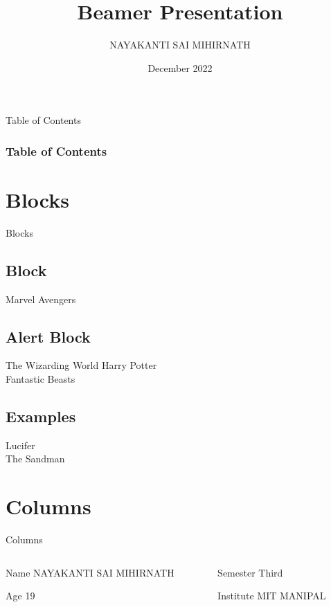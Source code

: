 \documentclass{beamer}
\title{Beamer Presentation}
\author{NAYAKANTI SAI MIHIRNATH}
\institute{MIT MANIPAL}
\date{December 2022}
\begin{document}
	\frame{\titlepage}
	\newpage
	\begin{frame}{Table of Contents}
		\frametitle{Table of Contents}
		\tableofcontents
	\end{frame}
	\newpage
	\section{Blocks}
	\begin{frame}{Blocks}
		\subsection{Block}
		\begin{block}{Marvel}
			Avengers
		\end{block}
		\subsection{Alert Block}
		\begin{alertblock}{The Wizarding World}
			Harry Potter\\
			Fantastic Beasts
		\end{alertblock}
		\subsection{Examples}
		\begin{examples}
			Lucifer \\
			The Sandman
		\end{examples}
	\end{frame}
	\newpage
	\section{Columns}
	\begin{frame}{Columns}
		\begin{columns}
			\begin{column}[]{0.4\textwidth}
				\begin{block}{Name}
					\small{NAYAKANTI SAI MIHIRNATH}
				\end{block}
				\begin{block}{Age}
					19
				\end{block}
			\end{column}
			\begin{column}[]{0.4\textwidth}
				\begin{block}{Semester}
					Third
				\end{block}
				\begin{block}{Institute}
					MIT MANIPAL
				\end{block}
			\end{column}
		\end{columns}
	\end{frame}
	\newpage
\end{document}
